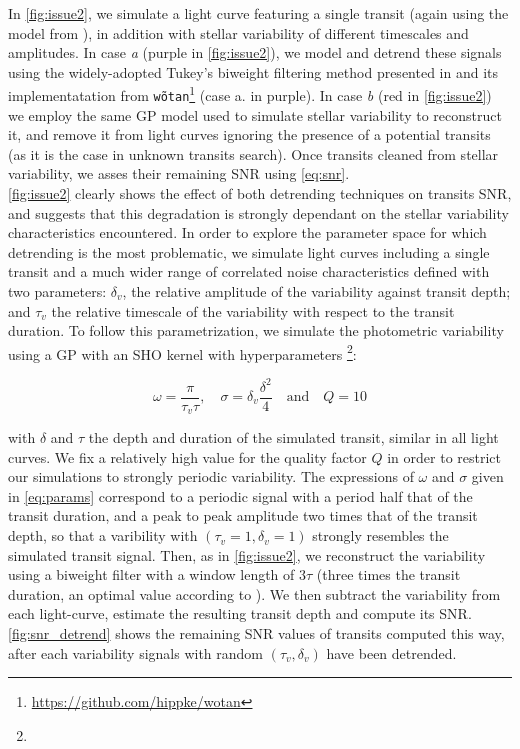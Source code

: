 \documentclass{aastex631}
\begin{document}
In \autoref{fig:issue2}, we simulate a light curve featuring a single transit (again using the model from \citealt{protopapas}), in addition with stellar variability of different timescales and amplitudes. In case \textit{a} (purple in \autoref{fig:issue2}), we model and detrend these signals using the widely-adopted Tukey's biweight filtering method presented in \citealt{tukey} and its implementatation from \texttt{wõtan}\footnote{\href{https://github.com/hippke/wotan}{https://github.com/hippke/wotan}} \citep{wotan} (case a. in purple). In case \textit{b} (red in \autoref{fig:issue2}) we employ the same GP model used to simulate stellar variability to reconstruct it, and remove it from light curves ignoring the presence of a potential transits (as it is the case in unknown transits search). Once transits cleaned from stellar variability, we asses their remaining SNR using \autoref{eq:snr}.
\bigskip\\
\autoref{fig:issue2} clearly shows the effect of both detrending techniques on transits SNR, and suggests that this degradation is strongly dependant on the stellar variability characteristics encountered. In order to explore the parameter space for which detrending is the most problematic, we simulate light curves including a single transit and a much wider range of correlated noise characteristics defined with two parameters: $\delta_v$, the relative amplitude of the variability against transit depth; and $\tau_v$ the relative timescale of the variability with respect to the transit duration. To follow this parametrization, we simulate the photometric variability using a GP with an SHO kernel with hyperparameters \footnote{}:

\begin{equation}\label{eq:params}
    \omega = \frac{\pi}{\tau_v\tau}, \quad 
    \sigma = \delta_v \frac{\delta^2}{4}  \quad  \text{and}  \quad  
    Q = 10
\end{equation}

with $\delta$ and $\tau$ the depth and duration of the simulated transit, similar in all light curves. We fix a relatively high value for the quality factor $Q$ in order to restrict our simulations to strongly periodic variability. The expressions of $\omega$ and $\sigma$ given in \autoref{eq:params} correspond to a periodic signal with a period half that of the transit duration, and a peak to peak amplitude two times that of the transit depth, so that a varibility with $(\tau_v=1, \delta_v=1)$ strongly resembles the simulated transit signal. Then, as in \autoref{fig:issue2}, we reconstruct the variability using a biweight filter with a window length of $3\tau$ (three times the transit duration, an optimal value according to \citealt{wotan}). We then subtract the variability from each light-curve, estimate the resulting transit depth and compute its SNR. \autoref{fig:snr_detrend} shows the remaining SNR values of transits computed this way, after each variability signals with random $(\tau_v, \delta_v)$ have been detrended.
\end{document}
